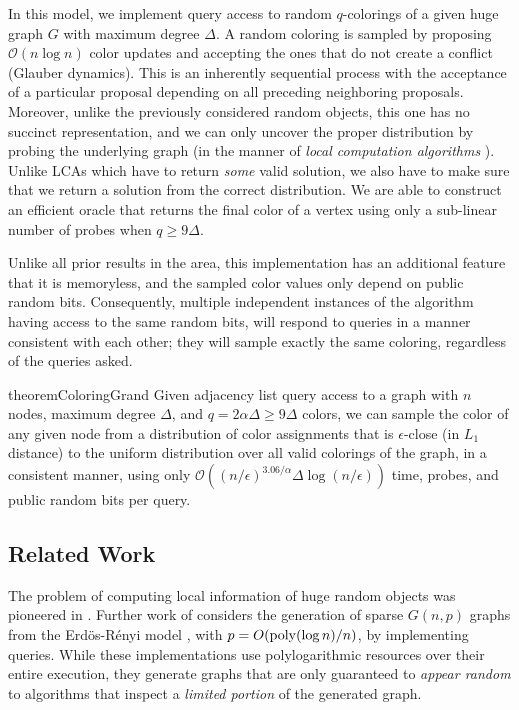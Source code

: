 In this model, we implement query access to random $q$-colorings of a given huge graph $G$ with maximum degree $\Delta$.
A random coloring is sampled by proposing $\mathcal O(n\log n)$ color updates and accepting the ones that do not create a conflict (Glauber dynamics).
This is an inherently sequential process with the acceptance of a particular proposal depending on all preceding neighboring proposals.
Moreover, unlike the previously considered random objects, this one has no succinct representation, and we can only uncover the proper distribution
by probing the underlying graph (in the manner of \emph{local computation algorithms} \cite{LCA, LCA_space_efficient}).
Unlike LCAs which have to return \emph{some} valid solution, we also have to make sure that we return a solution from the correct distribution.
We are able to construct an efficient oracle that returns the final color of a vertex using only a sub-linear number of probes when $q\ge 9\Delta$.

Unlike all prior results in the area, this implementation has an additional feature that it is memoryless,
and the sampled color values only depend on public random bits.
Consequently, multiple independent instances of the algorithm having access to the same random bits,
will respond to queries in a manner consistent with each other; they will sample exactly the same coloring, regardless of the queries asked.

\begin{restatable}{theorem}{ColoringGrand}
\label{thm:coloring_generator_main}
Given adjacency list query access to a graph with $n$ nodes, maximum degree $\Delta$, and $q=2\alpha\Delta \ge 9\Delta$ colors,
we can sample the color of any given node from a distribution of color assignments that is $\epsilon$-close (in $L_1$ distance)
to the uniform distribution over all valid colorings of the graph, in a consistent manner,
using only $\mathcal O((n/\epsilon)^{3.06/\alpha}\Delta\log (n/\epsilon))$ time, probes, and public random bits per query.
\end{restatable}




\subsection{Related Work}
\label{sec:related_work}
The problem of computing local information of huge random objects was pioneered in \cite{huge_old,huge}.
Further work of \cite{sparse} considers the generation of sparse $G(n,p)$ graphs from the Erd\"{o}s-R\'{e}nyi model \cite{er},
with $p = O(\mathrm{poly}(\log n)/n)$, by implementing  queries.
While these implementations use polylogarithmic resources over their entire execution,
they generate graphs that are  only guaranteed to \emph{appear random} to algorithms that inspect a \emph{limited portion} of the generated graph.


